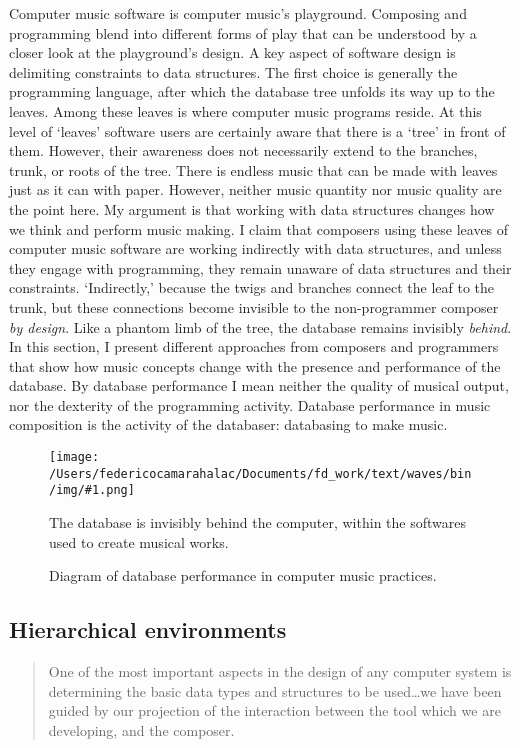 \documentclass[
]{book}
\newcommand{\img}[4]{
\begin{figure}[!htbp]
\centering
\texttt{[image: /Users/federicocamarahalac/Documents/fd\_work/text/waves/bin/img/\#1.png]}
\caption{#4}
\label{img:#1}
#3
\end{figure}
\FloatBarrier
}
\begin{document}
Computer music software is computer music's playground. Composing and programming blend into different forms of play that can be understood by a closer look at the playground's design. A key aspect of software design is delimiting constraints to data structures. The first choice is generally the programming language, after which the database tree unfolds its way up to the leaves. Among these leaves is where computer music programs reside. At this level of `leaves' software users are certainly aware that there is a `tree' in front of them. However, their awareness does not necessarily extend to the branches, trunk, or roots of the tree. There is endless music that can be made with leaves just as it can with paper. However, neither music quantity nor music quality are the point here. My argument is that working with data structures changes how we think and perform music making. I claim that composers using these leaves of computer music software are working indirectly with data structures, and unless they engage with programming, they remain unaware of data structures and their constraints. `Indirectly,' because the twigs and branches connect the leaf to the trunk, but these connections become invisible to the non-programmer composer \textit{by design}. Like a phantom limb of the tree, the database remains invisibly \textit{behind}. In this section, I present different approaches from composers and programmers that show how music concepts change with the presence and performance of the database. By database performance I mean neither the quality of musical output, nor the dexterity of the programming activity. Database performance in music composition is the activity of the databaser: databasing to make music.

\img{comp}{0.2}{
	The database is invisibly behind the computer, within the softwares used to create musical works. 
}{Diagram of database performance in computer music practices.}

\subsection{Hierarchical environments}
\label{computer:sssp}

\begin{quote}
	One of the most important aspects in the design of any computer system is determining the basic data types and structures to be used\dots we have been guided by our projection of the interaction between the tool which we are developing, and the composer. \parencite[119]{icmc/bbp2372.1978.012}
\end{quote}
\end{document}
